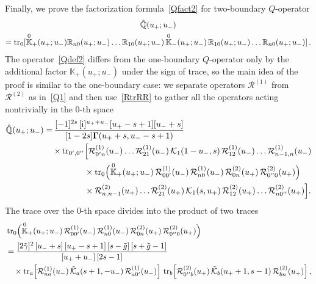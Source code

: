 \documentclass[a4paper,11pt]{article}
\renewcommand{\imath}{\mathrm{i}}
\newcommand{\tr}{\mathop{\rm tr}\nolimits}
\numberwithin{equation}{section}
\begin{document}
Finally, we prove the factorization formula~\eqref{Qfact2} for two-boundary $Q$-operator
\begin{multline} \label{Qdef2}
	\hat{\mathbb{Q}}(u_+;u_-) \\
	= \tr_0[\overset{0}{\mathbb{K}}_+(u_+;u_-)\mathbb{R}_{n0}(u_+;u_-)\dots\mathbb{R}_{10}(u_+;u_-)\,\overset{0}{\mathbb{K}}_-(u_+;u_-)\,\mathbb{R}_{10}(u_+;u_-)\dots\mathbb{R}_{n0}(u_+;u_-)] \,.
\end{multline}
The operator~\eqref{Qdef2} differs from the one-boundary $Q$-operator only by the additional factor $\mathbb{K}_+(u_+;u_-)$ under the sign of trace,
so the main idea of the proof is similar to the one-boundary case: we
separate operators $\mathcal{R}^{(1)}$ from $\mathcal{R}^{(2)}$ as in~\eqref{Q1} and then use~\eqref{RtrRR} to gather all the operators acting nontrivially in the $0$-th space
\begin{align}
	\nonumber
	\hat{\mathbb{Q}}(u_+;u_-) = & \,
	\frac{[-1]^{2s}\,[\imath]^{u_+ + u_-} [u_+-s+1] [u_-+s]}{[1-2s] \mathbf{\Gamma}(u_++s, u_--s+1)} \\
	& \label{Q4}
	\begin{aligned}
		\, \times \tr_{0',0''} &\Bigl[\mathcal{R}^{(1)}_{0'n}(u_-)\ldots\mathcal{R}^{(1)}_{21}(u_-)\,\mathcal{K}_1(1-u_-,s)\,\mathcal{R}^{(1)}_{12}(u_-)\ldots\mathcal{R}^{(1)}_{n-1,n}(u_-) \\
		&
		\times
		\tr_0\Bigl( \overset{0}{\mathbb{K}}_+(u_+;u_-)\,\mathcal{R}^{(1)}_{00'}(u_-)\,\mathcal{R}^{(1)}_{n0}(u_-)\,\mathcal{R}^{(2)}_{0n}(u_+)\,\mathcal{R}^{(2)}_{0''0}(u_+) \Bigr) \\
		& 
		\times\mathcal{R}^{(2)}_{n,n-1}(u_+)\ldots\mathcal{R}^{(2)}_{21}(u_+)\,\mathcal{K}_1(s,u_+)\,\mathcal{R}^{(2)}_{12}(u_+)\ldots\mathcal{R}^{(2)}_{n0''}(u_+)\Bigr].
	\end{aligned}
\end{align}
The trace over the $0$-th space divides into the product of two traces
\begin{align}
	& \nonumber
	\tr_0\Bigl( \overset{0}{\mathbb{K}}_+(u_+;u_-)\,\mathcal{R}^{(1)}_{00'}(u_-)\,\mathcal{R}^{(1)}_{n0}(u_-)\,\mathcal{R}^{(2)}_{0n}(u_+)\,\mathcal{R}^{(2)}_{0''0}(u_+) \Bigr) \\
	& \nonumber
	= \frac{[2\tilde{\gamma}]^2\,[u_-+s]\,[u_+-s+1]\,[s-\tilde{g}]\,[s+\tilde{g}-1]}{[u_++u_-]\,[2s-1]} \\
	& \label{trKRRRR}
	\quad \times \tr_a\Bigl[\mathcal{R}^{(1)}_{na}(u_-)\,\tilde{\mathcal{K}}_a(s+1,-u_-)\,\mathcal{R}^{(1)}_{a0'}(u_-)\Bigr] \,
	\tr_b\Bigl[\mathcal{R}^{(2)}_{0''b}(u_+)\,\tilde{\mathcal{K}}_b(u_++1,s-1)\,\mathcal{R}^{(2)}_{bn}(u_+)\Bigr] \,,
\end{align}
\end{document}
